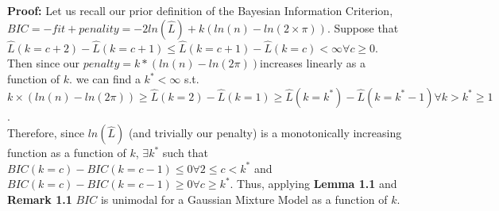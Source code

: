 \documentclass{article}
\begin{document}
\textbf{Proof:} Let us recall our prior definition of the Bayesian Information Criterion,  \(BIC = -fit + penality = -2ln(\hat{L}) + k(ln(n) - ln(2 \times\pi))\). Suppose that \(\hat{L}(k = c+2) - \hat{L}(k = c +1) \leq \hat{L}(k = c+1) - \hat{L}(k = c) < \infty \forall c \geq 0\).  \\Then since our \(penalty = k*(ln(n) - ln(2\pi))\)increases linearly as a function of \(k\). we can find a \(k^* < \infty\) s.t. \(k \times (ln(n) - ln(2\pi)) \geq \hat{L}(k=2) - \hat{L}(k=1) \geq \hat{L}(k=k^*) - \hat{L}(k=k^* - 1) \forall k > k^*\geq 1\). \\Therefore, since \(ln(\hat{L})\) (and trivially our penalty) is a monotonically increasing function as a function of \(k\), \(\exists k^*\) such that \(BIC(k = c) - BIC(k = c-1) \leq 0 \forall 2 \leq c < k^{*}\) and   \(BIC(k = c) - BIC(k = c-1) \geq 0 \forall c \geq k^{*}\). Thus, applying \textbf{Lemma 1.1} and \textbf{Remark 1.1} \(BIC\) is unimodal for a Gaussian Mixture Model as a function of \(k\).
\end{document}

